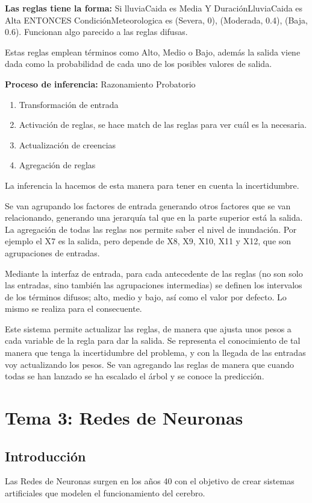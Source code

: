 \documentclass[12pt, twoside, openright]{report} %
\begin{document}
\textbf{Las reglas tiene la forma:} Si lluviaCaida es Media Y DuraciónLluviaCaida es Alta ENTONCES CondiciónMeteorologica es {(Severa, 0), (Moderada, 0.4), (Baja, 0.6)}. Funcionan algo parecido a las reglas difusas.

Estas reglas emplean términos como Alto, Medio o Bajo, además la salida viene dada como la probabilidad de cada uno de los posibles valores de salida.

\textbf{Proceso de inferencia:} Razonamiento Probatorio
\begin{enumerate}
	\item Transformación de entrada
	\item Activación de reglas, se hace match de las reglas para ver cuál es la necesaria.
	\item Actualización de creencias
	\item Agregación de reglas
\end{enumerate}
La inferencia la hacemos de esta manera para tener en cuenta la incertidumbre.

Se van agrupando los factores de entrada generando otros factores que se van relacionando, generando una jerarquía tal que en la parte superior está la salida. La agregación de todas las reglas nos permite saber el nivel de inundación. Por ejemplo el X7 es la salida, pero depende de X8, X9, X10, X11 y X12, que son agrupaciones de entradas.

Mediante la interfaz de entrada, para cada antecedente de las reglas (no son solo las entradas, sino también las agrupaciones intermedias) se definen los intervalos de los términos difusos; alto, medio y bajo, así como el valor por defecto. Lo mismo se realiza para el consecuente.

Este sistema permite actualizar las reglas, de manera que ajusta unos pesos a cada variable de la regla para dar la salida. Se representa el conocimiento de tal manera que tenga la incertidumbre del problema, y con la llegada de las entradas voy actualizando los pesos. Se van agregando las reglas de manera que cuando todas se han lanzado se ha escalado el árbol y se conoce la predicción.

\chapter{Tema 3: Redes de Neuronas}
\section{Introducción}
Las Redes de Neuronas surgen en los años 40 con el objetivo de crear sistemas artificiales que modelen el funcionamiento del cerebro.
\end{document}
